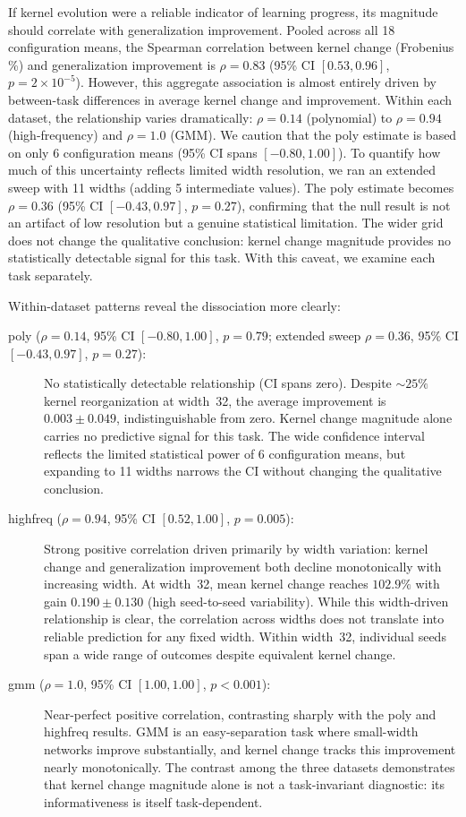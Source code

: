 \documentclass[10pt]{article}
\begin{document}
If kernel evolution were a reliable indicator of learning progress, its magnitude should correlate with generalization improvement.  Pooled across all 18 configuration means, the Spearman correlation between kernel change (Frobenius \%) and generalization improvement is $\rho=0.83$ (95\% CI $[0.53, 0.96]$, $p=2\times10^{-5}$).  However, this aggregate association is almost entirely driven by between-task differences in average kernel change and improvement. Within each dataset, the relationship varies dramatically: $\rho=0.14$ (polynomial) to $\rho=0.94$ (high-frequency) and $\rho=1.0$ (GMM).  We caution that the poly estimate is based on only 6 configuration means (95\% CI spans $[-0.80, 1.00]$). To quantify how much of this uncertainty reflects limited width resolution, we ran an extended sweep with 11 widths (adding 5 intermediate values). The poly estimate becomes $\rho=0.36$ (95\% CI $[-0.43, 0.97]$, $p=0.27$), confirming that the null result is not an artifact of low resolution but a genuine statistical limitation. The wider grid does not change the qualitative conclusion: kernel change magnitude provides no statistically detectable signal for this task. With this caveat, we examine each task separately.

Within-dataset patterns reveal the dissociation more clearly:
\begin{description}
        \item[poly ($\rho=0.14$, 95\% CI ${[-0.80, 1.00]}$, $p=0.79$; extended sweep $\rho=0.36$, 95\% CI ${[-0.43, 0.97]}$, $p=0.27$):] No statistically detectable relationship (CI spans zero).  Despite $\sim25\%$ kernel reorganization at width~32, the average improvement is $0.003\pm0.049$, indistinguishable from zero.  Kernel change magnitude alone carries no predictive signal for this task. The wide confidence interval reflects the limited statistical power of 6 configuration means, but expanding to 11 widths narrows the CI without changing the qualitative conclusion.
    \item[highfreq ($\rho=0.94$, 95\% CI ${[0.52, 1.00]}$, $p=0.005$):] Strong positive correlation driven primarily by width variation: kernel change and generalization improvement both decline monotonically with increasing width.  At width~32, mean kernel change reaches $102.9\%$ with gain $0.190\pm0.130$ (high seed-to-seed variability).  While this width-driven relationship is clear, the correlation across widths does not translate into reliable prediction for any fixed width. Within width~32, individual seeds span a wide range of outcomes despite equivalent kernel change.
    \item[gmm ($\rho=1.0$, 95\% CI ${[1.00, 1.00]}$, $p<0.001$):] Near-perfect positive correlation, contrasting sharply with the poly and highfreq results.  GMM is an easy-separation task where small-width networks improve substantially, and kernel change tracks this improvement nearly monotonically.  The contrast among the three datasets demonstrates that kernel change magnitude alone is not a task-invariant diagnostic: its informativeness is itself task-dependent.

\end{description}
\end{document}
